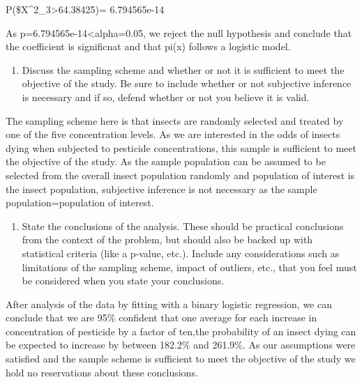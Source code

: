 \documentclass[]{article}
\providecommand{\tightlist}{%
  \setlength{\itemsep}{0pt}\setlength{\parskip}{0pt}}
\begin{document}
P(\$X\^{}2\_3\textgreater{}64.38425)= 6.794565e-14

As p=6.794565e-14\textless{}alpha=0.05, we reject the null hypothesis
and conclude that the coefficient is significnat and that pi(x) follows
a logistic model.

\begin{enumerate}
\def\labelenumi{\Alph{enumi})}
\setcounter{enumi}{4}
\tightlist
\item
  Discuss the sampling scheme and whether or not it is sufficient to
  meet the objective of the study. Be sure to include whether or not
  subjective inference is necessary and if so, defend whether or not you
  believe it is valid.
\end{enumerate}

The sampling scheme here is that insects are randomly selected and
treated by one of the five concentration levels. As we are interested in
the odds of insects dying when subjected to pesticide concentrations,
this sample is sufficient to meet the objective of the study. As the
sample population can be assumed to be selected from the overall insect
population randomly and population of interest is the insect population,
subjective inference is not necessary as the sample
population=population of interest.

\begin{enumerate}
\def\labelenumi{\Alph{enumi})}
\setcounter{enumi}{5}
\tightlist
\item
  State the conclusions of the analysis. These should be practical
  conclusions from the context of the problem, but should also be backed
  up with statistical criteria (like a p-value, etc.). Include any
  considerations such as limitations of the sampling scheme, impact of
  outliers, etc., that you feel must be considered when you state your
  conclusions.
\end{enumerate}

After analysis of the data by fitting with a binary logistic regression,
we can conclude that we are 95\% confident that one average for each
increase in concentration of pesticide by a factor of ten,the
probability of an insect dying can be expected to increase by between
182.2\% and 261.9\%. As our assumptions were satisfied and the sample
scheme is sufficient to meet the objective of the study we hold no
reservations about these conclusions.
\end{document}
